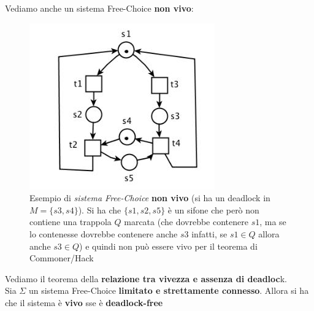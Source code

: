 \documentclass[a4paper,12pt, oneside]{book}
\begin{document}
\begin{esempio}
  Vediamo anche un sistema Free-Choice \textbf{non vivo}:
  \begin{figure}[H]
    \centering
    \includegraphics[scale = 0.55]{img/fc5.jpg}
    \caption{Esempio di \emph{sistema Free-Choice} \textbf{non vivo} (si ha un
      deadlock in $M=\{s3,s4\}$). Si ha che $\{s1,s2,s5\} $ è un sifone che però
      non contiene una trappola $Q$ marcata (che dovrebbe contenere $s1$, ma se lo
      contenesse dovrebbe contenere anche $s3$ infatti, se $s1 \in Q$ allora anche
      $s3 \in Q$) e quindi non può essere vivo per il teorema di Commoner/Hack}  
  \end{figure}
\end{esempio}
\begin{teorema}
  Vediamo il teorema della \textbf{relazione tra vivezza e assenza di
    deadloc}k.\\
  Sia $\Sigma$ un sistema Free-Choice \textbf{limitato e strettamente
    connesso}. Allora si ha che il sistema è \textbf{vivo} sse è 
  \textbf{deadlock-free} 
\end{teorema}
\end{document}

